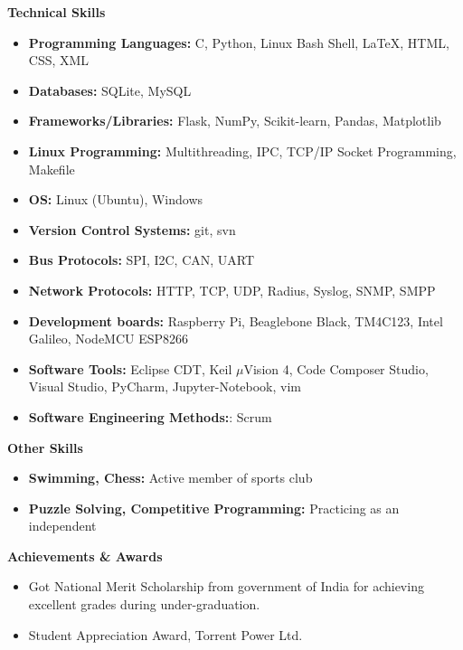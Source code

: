 \documentclass[letterpaper,11pt]{article}
\newcommand{\resheading}[1]{{\large \colorbox{mygrey}{\begin{minipage}{\textwidth}{\textbf{#1 \vphantom{p\^{E}}}}\end{minipage}}}}
\begin{document}
\resheading{Technical Skills}
\begin{itemize}

    \item \textbf{Programming Languages:} C, Python, Linux Bash Shell, LaTeX, HTML, CSS, XML
    \item \textbf{Databases:} SQLite, MySQL
    \item \textbf{Frameworks/Libraries:} Flask, NumPy, Scikit-learn, Pandas, Matplotlib
    \item \textbf{Linux Programming:} Multithreading, IPC, TCP/IP Socket Programming, Makefile
    \item \textbf{OS:} Linux (Ubuntu), Windows
    \item \textbf{Version Control Systems:} git, svn
    \item \textbf{Bus Protocols:} SPI, I2C, CAN, UART
    \item \textbf{Network Protocols:} HTTP, TCP, UDP, Radius, Syslog, SNMP, SMPP
    \item \textbf{Development boards:} Raspberry Pi, Beaglebone Black, TM4C123, Intel Galileo, NodeMCU ESP8266
    \item \textbf{Software Tools:} Eclipse CDT, Keil $\mu$Vision 4, Code Composer Studio, Visual Studio, PyCharm, Jupyter-Notebook, vim
    \item \textbf{Software Engineering Methods:}: Scrum

\end{itemize}


\resheading{Other Skills}
    \begin{itemize}
        \item \textbf{Swimming, Chess:} Active member of sports club
        \item \textbf{Puzzle Solving, Competitive Programming:} Practicing as an independent
    \end{itemize}

        
\resheading{Achievements \& Awards}
\begin{itemize}
	\item Got National Merit Scholarship from government of India for achieving excellent grades during under-graduation.
	\item Student Appreciation Award, Torrent Power Ltd.
\end{itemize}
\end{document}

